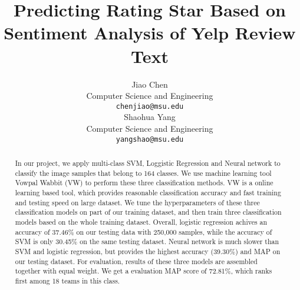 \documentclass[11pt]{article}
\title{Predicting Rating Star Based on Sentiment Analysis of Yelp Review Text}
\author{Jiao Chen \\
  Computer Science and Engineering\\
  {\tt chenjiao@msu.edu} \\\And
  Shaohua Yang\\
  Computer Science and Engineering\\
  {\tt yangshao@msu.edu} \\}
\date{}
\begin{document}
\maketitle
\begin{abstract}
In our project, we apply multi-class SVM, Loggistic Regression and Neural network to classify the image samples that belong to 164 classes. We use machine learning tool Vowpal Wabbit (VW) to perform these three classification methods. VW is a online learning based tool, which provides reasonable classification accuracy and fast training and testing speed on large dataset. We tune the hyperparameters of these three classification models on part of our training dataset, and then train three classification models based on the whole training dataset. Overall, logistic regression achives an accuracy of 37.46\% on our testing data with 250,000 samples, while the accuracy of SVM is only 30.45\% on the same testing dataset. Neural network is much slower than SVM and logistic regression, but provides the highest accuracy (39.30\%) and MAP on our testing dataset. For evaluation, results of these three models are assembled together with equal weight. We get a evaluation MAP score of 72.81\%, which ranks first among 18 teams in this class.   
\end{abstract}


%
%
%


%
%


\clearpage
{\small


}
\end{document}
